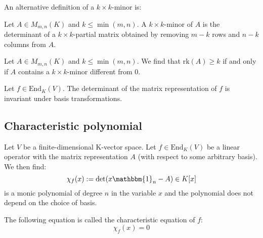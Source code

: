         An alternative definition of a $k\times k$-minor is: 
        \begin{definition}
			Let $A\in M_{m,n}(K)$ and $k\leq\min(m, n)$. A $k\times k$-minor of $A$ is the determinant of a $k\times k$-partial matrix obtained by removing $m-k$ rows and $n-k$ columns from $A$.
		\end{definition}
        \begin{theorem}
			Let $A\in M_{m,n}(K)$ and $k\leq\min(m, n)$. We find that $\text{rk}(A)\geq k$ if and only if $A$ contains a $k\times k$-minor different from 0.
		\end{theorem}
        
        \begin{theorem}
			Let $f\in \text{End}_K(V)$. The determinant of the matrix representation of $f$ is invariant under basis transformations.
		\end{theorem}

	\subsection{Characteristic polynomial}
    	\begin{definition}
        	\label{linalgebra:characteristic_polynomial}
			Let $V$ be a finite-dimensional K-vector space. Let $f\in \text{End}_K(V)$ be a linear operator with the matrix representation $A$ (with respect to some arbitrary basis). We then find:
            \begin{equation}
                \chi_f(x) := \det(x\mathbbm{1}_n - A) \in K[x]
			\end{equation}
            is a monic polynomial of degree $n$ in the variable $x$ and the polynomial does not depend on the choice of basis.
		\end{definition}
        
        \begin{definition}
			The following equation is called the characteristic equation of $f$:
            \begin{equation}
            	\label{linalgebra:characteristic_equation}
				\boxed{\chi_f(x) = 0}
			\end{equation}
		\end{definition}
        
